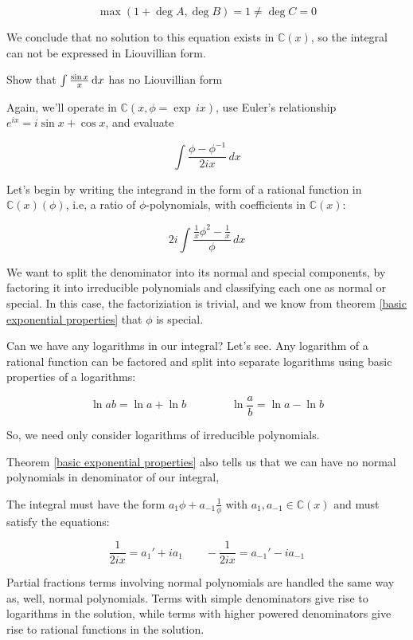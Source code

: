 $$\max(1 + \deg A, \deg B) = 1 \ne \deg C = 0$$

We conclude that no solution to this equation exists in ${\mathbb C}(x)$,
so the integral can not be expressed in Liouvillian form.

\endexample


\example Show that $\int \frac{\sin x}{x} \, {\rm d}x$ has no Liouvillian form

Again, we'll operate in ${\mathbb C}(x, \phi = \exp \,ix)$, use
Euler's relationship $e^{ix}=i\sin x + \cos x$, and evaluate

$$\int \frac{\phi - \phi^{-1}}{2ix} \,dx$$

Let's begin by writing the integrand in the form of a rational
function in ${\mathbb C}(x)(\phi)$, i.e, a ratio
of $\phi$-polynomials, with coefficients in ${\mathbb C}(x)$:

$$2i \int \frac{\frac{1}{x}\phi^2 - \frac{1}{x}}{\phi} \,dx$$

We want to split the denominator into its normal and special
components, by factoring it into irreducible polynomials and
classifying each one as normal or special.  In this case, the
factoriziation is trivial, and we know from theorem \ref{basic
exponential properties} that $\phi$ is special.

Can we have any logarithms in our integral?  Let's see.
Any logarithm of a rational function can be factored and
split into separate logarithms using basic properties
of a logarithms:

$$\ln ab = \ln a + \ln b \qquad\qquad \ln\frac{a}{b} = \ln a - \ln b$$

So, we need only consider logarithms of irreducible polynomials.

Theorem \ref{basic exponential properties} also tells us that we can
have no normal polynomials in denominator of our integral,


The integral must have the form $a_1 \phi + a_{-1} \frac{1}{\phi}$
with $a_1, a_{-1} \in {\mathbb C}(x)$ and must satisfy the equations:

$$\frac{1}{2ix} = a_1' + i a_1 \qquad - \frac{1}{2ix} = a_{-1}' - i a_{-1}$$

\endexample

\vfil\eject

Partial fractions terms involving normal polynomials are handled the
same way as, well, normal polynomials.  Terms with simple denominators
give rise to logarithms in the solution, while terms with higher
powered denominators give rise to rational functions in the solution.


